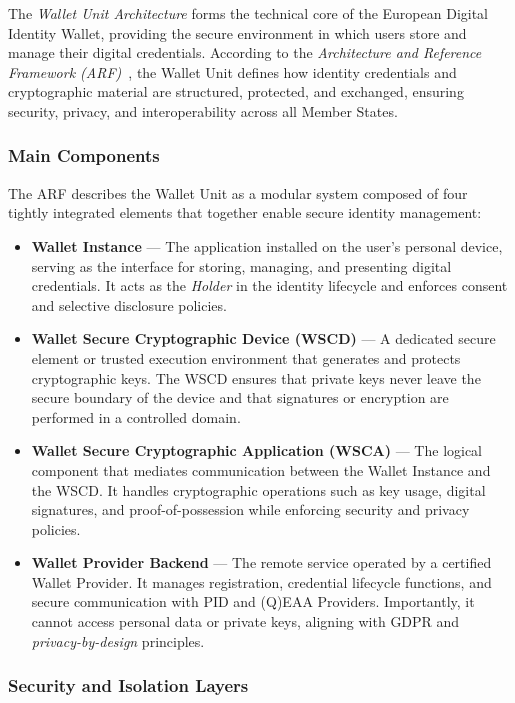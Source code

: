 \documentclass[sigconf,balance,nonacm,authordraft]{acmart}
\begin{document}
The \textit{Wallet Unit Architecture} forms the technical core of the European Digital Identity Wallet, providing the secure environment in which users store and manage their digital credentials. According to the \textit{Architecture and Reference Framework (ARF)}~\cite{EU_ARF2024}, the Wallet Unit defines how identity credentials and cryptographic material are structured, protected, and exchanged, ensuring security, privacy, and interoperability across all Member States.

\subsubsection*{Main Components}

The ARF describes the Wallet Unit as a modular system composed of four tightly integrated elements that together enable secure identity management:

\begin{itemize}
    \item \textbf{Wallet Instance} — The application installed on the user’s personal device, serving as the interface for storing, managing, and presenting digital credentials. It acts as the \textit{Holder} in the identity lifecycle and enforces consent and selective disclosure policies.
    \item \textbf{Wallet Secure Cryptographic Device (WSCD)} — A dedicated secure element or trusted execution environment that generates and protects cryptographic keys. The WSCD ensures that private keys never leave the secure boundary of the device and that signatures or encryption are performed in a controlled domain.
    \item \textbf{Wallet Secure Cryptographic Application (WSCA)} — The logical component that mediates communication between the Wallet Instance and the WSCD. It handles cryptographic operations such as key usage, digital signatures, and proof-of-possession while enforcing security and privacy policies.
    \item \textbf{Wallet Provider Backend} — The remote service operated by a certified Wallet Provider. It manages registration, credential lifecycle functions, and secure communication with PID and (Q)EAA Providers. Importantly, it cannot access personal data or private keys, aligning with GDPR and \textit{privacy-by-design} principles.
\end{itemize}

\subsubsection*{Security and Isolation Layers}
\end{document}
